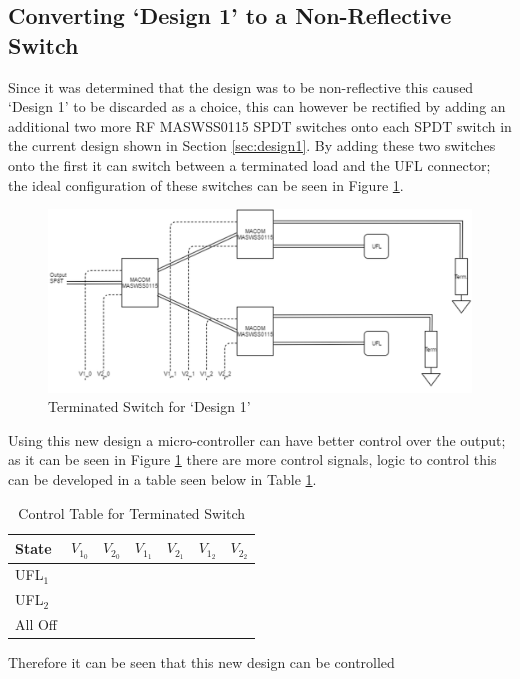 \documentclass[12pt,openany,a4paper]{book}
\begin{document}
\subsection{Converting `Design 1' to a Non-Reflective Switch}
Since it was determined that the design was to be non-reflective this caused `Design 1' to be discarded as a choice, this can however be rectified by adding an additional two more RF MASWSS0115 SPDT switches onto each SPDT switch in the current design shown in Section \ref{sec:design1}. By adding these two switches onto the first it can switch between a terminated load and the UFL connector; the ideal configuration of these switches can be seen in Figure \ref{fig:corrected-design1}.
\begin{figure}[H]
	\centering
    \includegraphics[width=1\textwidth]{design1-rectify.png}
	\caption{Terminated Switch for `Design 1'}
	\label{fig:corrected-design1}
\end{figure}
Using this new design a micro-controller can have better control over the output; as it can be seen in Figure \ref{fig:corrected-design1} there are more control signals, logic to control this can be developed in a table seen below in Table \ref{tab:control-correcteddesign1}.
\begin{table}[H]
	\centering
	\begin{tabular}{l c c c c c c}
		\hline
		State & $V_{1_0}$ & $V_{2_0}$ & $V_{1_1}$ & $V_{2_1}$ & $V_{1_2}$ & $V_{2_2}$\\
		\hline
		UFL$_1$ & \\
		UFL$_2$ & \\
		All Off & \\
		\hline
	\end{tabular}
	\caption{Control Table for Terminated Switch}
	\label{tab:control-correcteddesign1}
\end{table}
Therefore it can be seen that this new design can be controlled 


%		
\end{document}

